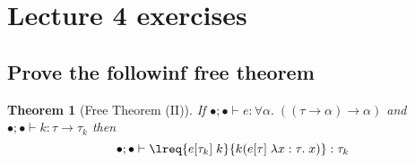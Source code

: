 \documentclass[a4paper,10pt,fleqn]{article}
\newcommand{\mtenv}{\ensuremath{\bullet}}
\newcommand{\tlabs}[3]{\ensuremath{\lambda #1 : #2 . \; #3}}
\newcommand{\tarrow}[2]{\ensuremath{ #1 \rightarrow #2}}
\newtheorem*{theorem}{Theorem}
\begin{document}
\section*{Lecture 4 exercises}
\subsection*{Prove the followinf free theorem}  
\begin{theorem}[Free Theorem (II)]
    If $\mtenv; \mtenv \vdash e : \forall \alpha. \; (\tarrow{(\tarrow{\tau}{\alpha})}{\alpha})$ and 
       $\mtenv; \mtenv \vdash k : \tarrow{\tau}{\tau_k}$ then
    \[
      \mtenv; \mtenv \vdash \lreq{e[\tau_k] \; k}{k(e[\tau] \; \tlabs{x}{\tau}{x})} : \tau_k
    \]
  \end{theorem}
\end{document}
